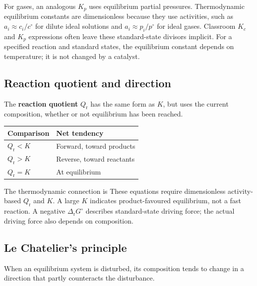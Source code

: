 \documentclass[a4paper,10pt]{article}
\begin{document}
For gases, an analogous $K_p$ uses equilibrium partial pressures. Thermodynamic
equilibrium constants are dimensionless because they use activities, such as
$a_i\approx c_i/c^\circ$ for dilute ideal solutions and
$a_i\approx p_i/p^\circ$ for ideal gases. Classroom $K_c$ and $K_p$ expressions
often leave these standard-state divisors implicit.
For a specified reaction and standard states, the equilibrium constant depends
on temperature; it is not changed by a catalyst.

\subsection{Reaction quotient and direction}
The \textbf{reaction quotient} $Q_{\mathrm r}$ has the same form as $K$, but
uses the current composition, whether or not equilibrium has been reached.
\begin{center}
\begin{tabular}{@{}ll@{}}
\toprule
Comparison & Net tendency \\
\midrule
$Q_{\mathrm r}<K$ & Forward, toward products \\
$Q_{\mathrm r}>K$ & Reverse, toward reactants \\
$Q_{\mathrm r}=K$ & At equilibrium \\
\bottomrule
\end{tabular}
\end{center}
The thermodynamic connection is
These equations require dimensionless activity-based $Q_{\mathrm r}$ and $K$.
A large $K$ indicates product-favoured equilibrium, not a fast reaction.
A negative $\Delta_{\mathrm r}G^\circ$ describes standard-state driving force;
the actual driving force also depends on composition.

\subsection{Le Chatelier's principle}
When an equilibrium system is disturbed, its composition tends to change in
a direction that partly counteracts the disturbance.
\end{document}
